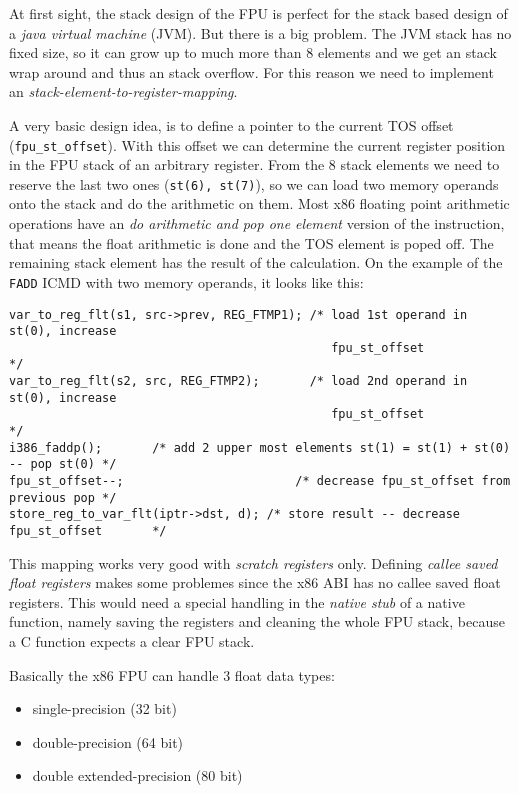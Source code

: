 At first sight, the stack design of the FPU is perfect for the stack
based design of a \textit{java virtual machine} (JVM). But there is a
big problem. The JVM stack has no fixed size, so it can grow up to
much more than 8 elements and we get an stack wrap around and thus an
stack overflow. For this reason we need to implement an
\textit{stack-element-to-register-mapping}.

A very basic design idea, is to define a pointer to the current TOS
offset (\texttt{fpu\_st\_offset}). With this offset we can determine
the current register position in the FPU stack of an arbitrary
register.  From the 8 stack elements we need to reserve the last two
ones (\texttt{st(6), st(7)}), so we can load two memory operands onto
the stack and do the arithmetic on them. Most x86 floating point
arithmetic operations have an \textit{do arithmetic and pop one
element} version of the instruction, that means the float arithmetic
is done and the TOS element is poped off. The remaining stack element
has the result of the calculation. On the example of the \texttt{FADD}
ICMD with two memory operands, it looks like this:

\begin{verbatim}
var_to_reg_flt(s1, src->prev, REG_FTMP1); /* load 1st operand in st(0), increase
                                             fpu_st_offset                          */
var_to_reg_flt(s2, src, REG_FTMP2);       /* load 2nd operand in st(0), increase
                                             fpu_st_offset                          */
i386_faddp();       /* add 2 upper most elements st(1) = st(1) + st(0) -- pop st(0) */
fpu_st_offset--;                        /* decrease fpu_st_offset from previous pop */
store_reg_to_var_flt(iptr->dst, d); /* store result -- decrease fpu_st_offset       */
\end{verbatim}

This mapping works very good with \textit{scratch registers}
only. Defining \textit{callee saved float registers} makes some
problemes since the x86 ABI has no callee saved float registers. This
would need a special handling in the \textit{native stub} of a native
function, namely saving the registers and cleaning the whole FPU
stack, because a C function expects a clear FPU stack.

Basically the x86 FPU can handle 3 float data types:

\begin{itemize}
 \item single-precision (32 bit)
 \item double-precision (64 bit)
 \item double extended-precision (80 bit)
\end{itemize}

